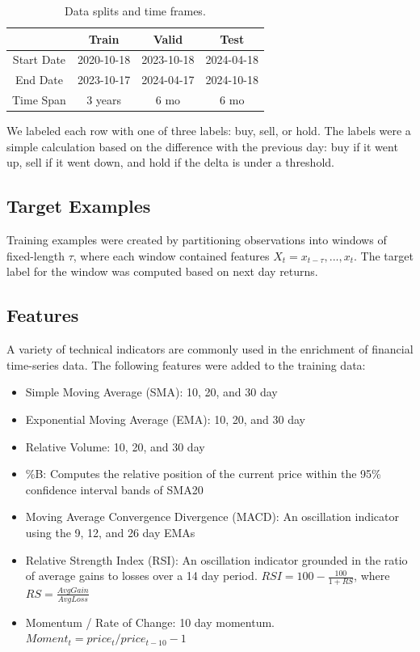 \documentclass[10pt,twocolumn,letterpaper]{article}
\begin{document}
\begin{table}
\begin{center}
    \begin{tabular}{|c|c|c|c|}
\hline
        & Train & Valid & Test \\
\hline
        Start Date & 2020-10-18 & 2023-10-18 & 2024-04-18 \\
\hline
        End Date & 2023-10-17 & 2024-04-17 & 2024-10-18 \\
\hline
        Time Span & 3 years & 6 mo & 6 mo \\
\hline
\end{tabular}
\end{center}
    \caption{Data splits and time frames.}
\label{tab:trainingsplits}
\end{table}

We labeled each row with one of three labels: buy, sell, or hold. The labels were a simple calculation based on the difference with the previous day: buy if it went up, sell if it went down, and hold if the delta is under a threshold.

    \subsection{Target Examples}
    Training examples were created by partitioning observations into windows of fixed-length $\tau$, where each window contained features $X_t = x_{t - \tau},..., x_t$. The target label for the window was computed based on next day returns.

    \subsection{Features}
A variety of technical indicators are commonly used in the enrichment of financial time-series data\cite{zou_survey,stock_charts}. The following features were added to the training data: 
    \begin{itemize}
        \item{Simple Moving Average (SMA): 10, 20, and 30 day}
        \item{Exponential Moving Average (EMA): 10, 20, and 30 day}
        \item{Relative Volume: 10, 20, and 30 day}
        \item{\%B: Computes the relative position of the current price within the 95\% confidence interval bands of SMA20}
        \item{Moving Average Convergence Divergence (MACD): An oscillation indicator using the 9, 12, and 26 day EMAs}
        \item{Relative Strength Index (RSI): An oscillation indicator grounded in the ratio of average gains to losses over a 14 day period. $RSI = 100 - \frac{100}{1 + RS}$, where $RS = \frac{AvgGain}{AvgLoss}$}
        \item{Momentum / Rate of Change: 10 day momentum. $Moment_t = price_t / price_{t-10} - 1$}
    \end{itemize}
\end{document}
